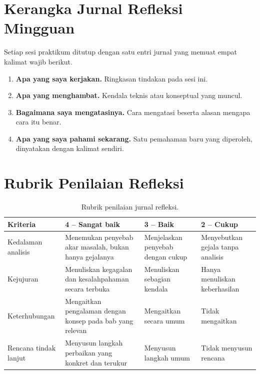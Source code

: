 \section{Kerangka Jurnal Refleksi Mingguan}

Setiap sesi praktikum ditutup dengan satu entri jurnal yang memuat
empat kalimat wajib berikut.

\begin{enumerate}
    \item \textbf{Apa yang saya kerjakan.} Ringkasan tindakan pada
          sesi ini.
    \item \textbf{Apa yang menghambat.} Kendala teknis atau konseptual
          yang muncul.
    \item \textbf{Bagaimana saya mengatasinya.} Cara mengatasi beserta
          alasan mengapa cara itu benar.
    \item \textbf{Apa yang saya pahami sekarang.} Satu pemahaman baru
          yang diperoleh, dinyatakan dengan kalimat sendiri.
\end{enumerate}

\section{Rubrik Penilaian Refleksi}

\begin{table}[H]
    \centering
    \caption{Rubrik penilaian jurnal refleksi.}
    \label{tab:app-rubrik-refleksi}
    \footnotesize
    \begin{tabular}{@{}p{3.0cm}p{3.4cm}p{3.4cm}p{3.4cm}@{}}
        \toprule
        \textbf{Kriteria} & \textbf{4 -- Sangat baik} &
        \textbf{3 -- Baik} & \textbf{2 -- Cukup} \\
        \midrule
        Kedalaman analisis & Menemukan penyebab akar masalah, bukan
        hanya gejalanya & Menjelaskan penyebab dengan cukup &
        Menyebutkan gejala tanpa analisis \\
        \addlinespace
        Kejujuran & Menuliskan kegagalan dan kesalahpahaman secara
        terbuka & Menuliskan sebagian kendala & Hanya menuliskan
        keberhasilan \\
        \addlinespace
        Keterhubungan & Mengaitkan pengalaman dengan konsep pada bab
        yang relevan & Mengaitkan secara umum & Tidak mengaitkan \\
        \addlinespace
        Rencana tindak lanjut & Menyusun langkah perbaikan yang
        konkret dan terukur & Menyusun langkah umum & Tidak
        menyusun rencana \\
        \bottomrule
    \end{tabular}
\end{table}

